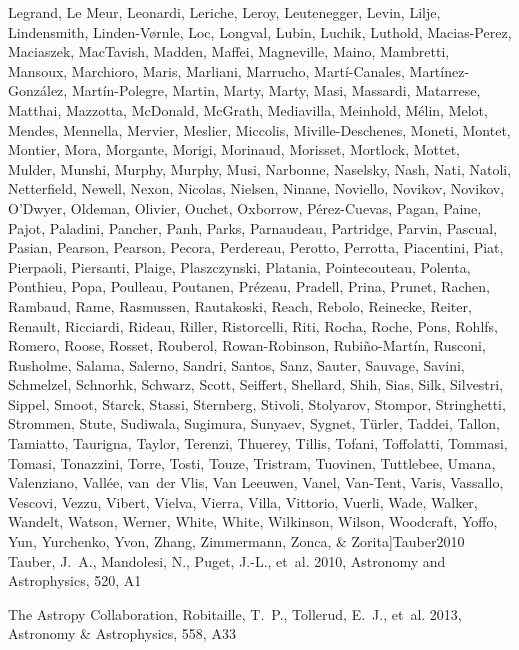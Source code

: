 \documentclass[apj, revtex4-1]{emulateapj}
\begin{document}
\begin{thebibliography}{}
{  Legrand, {Le Meur}, Leonardi, Leriche, Leroy, Leutenegger, Levin, Lilje,
  Lindensmith, Linden-V{\o}rnle, Loc, Longval, Lubin, Luchik, Luthold,
  Macias-Perez, Maciaszek, MacTavish, Madden, Maffei, Magneville, Maino,
  Mambretti, Mansoux, Marchioro, Maris, Marliani, Marrucho,
  Mart{\'{i}}-Canales, Mart{\'{i}}nez-Gonz{\'{a}}lez, Mart{\'{i}}n-Polegre,
  Martin, Marty, Marty, Masi, Massardi, Matarrese, Matthai, Mazzotta, McDonald,
  McGrath, Mediavilla, Meinhold, M{\'{e}}lin, Melot, Mendes, Mennella, Mervier,
  Meslier, Miccolis, Miville-Deschenes, Moneti, Montet, Montier, Mora,
  Morgante, Morigi, Morinaud, Morisset, Mortlock, Mottet, Mulder, Munshi,
  Murphy, Murphy, Musi, Narbonne, Naselsky, Nash, Nati, Natoli, Netterfield,
  Newell, Nexon, Nicolas, Nielsen, Ninane, Noviello, Novikov, Novikov, O'Dwyer,
  Oldeman, Olivier, Ouchet, Oxborrow, P{\'{e}}rez-Cuevas, Pagan, Paine, Pajot,
  Paladini, Pancher, Panh, Parks, Parnaudeau, Partridge, Parvin, Pascual,
  Pasian, Pearson, Pearson, Pecora, Perdereau, Perotto, Perrotta, Piacentini,
  Piat, Pierpaoli, Piersanti, Plaige, Plaszczynski, Platania, Pointecouteau,
  Polenta, Ponthieu, Popa, Poulleau, Poutanen, Pr{\'{e}}zeau, Pradell, Prina,
  Prunet, Rachen, Rambaud, Rame, Rasmussen, Rautakoski, Reach, Rebolo,
  Reinecke, Reiter, Renault, Ricciardi, Rideau, Riller, Ristorcelli, Riti,
  Rocha, Roche, Pons, Rohlfs, Romero, Roose, Rosset, Rouberol, Rowan-Robinson,
  Rubi{\~{n}}o-Mart{\'{i}}n, Rusconi, Rusholme, Salama, Salerno, Sandri,
  Santos, Sanz, Sauter, Sauvage, Savini, Schmelzel, Schnorhk, Schwarz, Scott,
  Seiffert, Shellard, Shih, Sias, Silk, Silvestri, Sippel, Smoot, Starck,
  Stassi, Sternberg, Stivoli, Stolyarov, Stompor, Stringhetti, Strommen, Stute,
  Sudiwala, Sugimura, Sunyaev, Sygnet, T{\"{u}}rler, Taddei, Tallon, Tamiatto,
  Taurigna, Taylor, Terenzi, Thuerey, Tillis, Tofani, Toffolatti, Tommasi,
  Tomasi, Tonazzini, Torre, Tosti, Touze, Tristram, Tuovinen, Tuttlebee, Umana,
  Valenziano, Vall{\'{e}}e, van~der Vlis, {Van Leeuwen}, Vanel, Van-Tent,
  Varis, Vassallo, Vescovi, Vezzu, Vibert, Vielva, Vierra, Villa, Vittorio,
  Vuerli, Wade, Walker, Wandelt, Watson, Werner, White, White, Wilkinson,
  Wilson, Woodcraft, Yoffo, Yun, Yurchenko, Yvon, Zhang, Zimmermann, Zonca, \&
  Zorita}]{Tauber2010}
Tauber, J.~A., Mandolesi, N., Puget, J.-L., {et~al.} 2010, Astronomy and
  Astrophysics, 520, A1

{The Astropy Collaboration}, Robitaille, T.~P., Tollerud, E.~J., {et~al.} 2013,
  Astronomy {\&} Astrophysics, 558, A33


\end{thebibliography}
\end{document}
